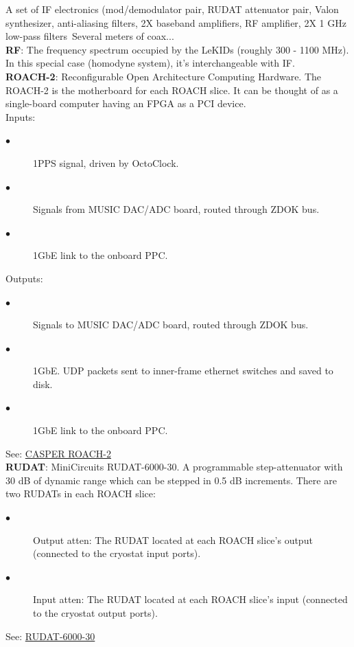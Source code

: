 A set of IF electronics (mod/demodulator pair, RUDAT attenuator pair, Valon synthesizer, anti-aliasing filters, 2X baseband amplifiers, RF amplifier, 2X 1 GHz low-pass filters\
Several meters of coax...\\
\textbf{RF}: The frequency spectrum occupied by the LeKIDs (roughly 300 - 1100 MHz). In this special case (homodyne system), it’s interchangeable with IF.\\
\textbf{ROACH-2}: Reconfigurable Open Architecture Computing Hardware. The ROACH-2 is the motherboard for each ROACH slice. It can be thought of as a single-board computer having an FPGA as a PCI device.\\
Inputs:
\begin{description}
  \item[$\bullet$] 1PPS signal, driven by OctoClock.
  \item[$\bullet$] Signals from MUSIC DAC/ADC board, routed through ZDOK bus.
  \item[$\bullet$] 1GbE link to the onboard PPC.
\end{description}
Outputs:
\begin{description}
  \item[$\bullet$] Signals to MUSIC DAC/ADC board, routed through ZDOK bus.
  \item[$\bullet$] 1GbE. UDP packets sent to inner-frame ethernet switches and saved to disk.
  \item[$\bullet$] 1GbE link to the onboard PPC.
\end{description}
See: \href{https://casper.ssl.berkeley.edu/wiki/ROACH-2_Revision_2}{CASPER ROACH-2}\\
\textbf{RUDAT}: MiniCircuits RUDAT-6000-30. A programmable step-attenuator with 30 dB of dynamic range which can be stepped in 0.5 dB increments. There are two RUDATs in each ROACH slice:
\setlist[description]{leftmargin=\parindent,labelindent=\parindent,nosep}
\begin{description}
  \item[$\bullet$] Output atten: The RUDAT located at each ROACH slice’s output (connected to the cryostat input ports).
  \item[$\bullet$] Input atten: The RUDAT located at each ROACH slice’s input (connected to the cryostat output ports).
\end{description}
See: \href{https://www.minicircuits.com/pdfs/RUDAT-6000-30.pdf}{RUDAT-6000-30}\\
